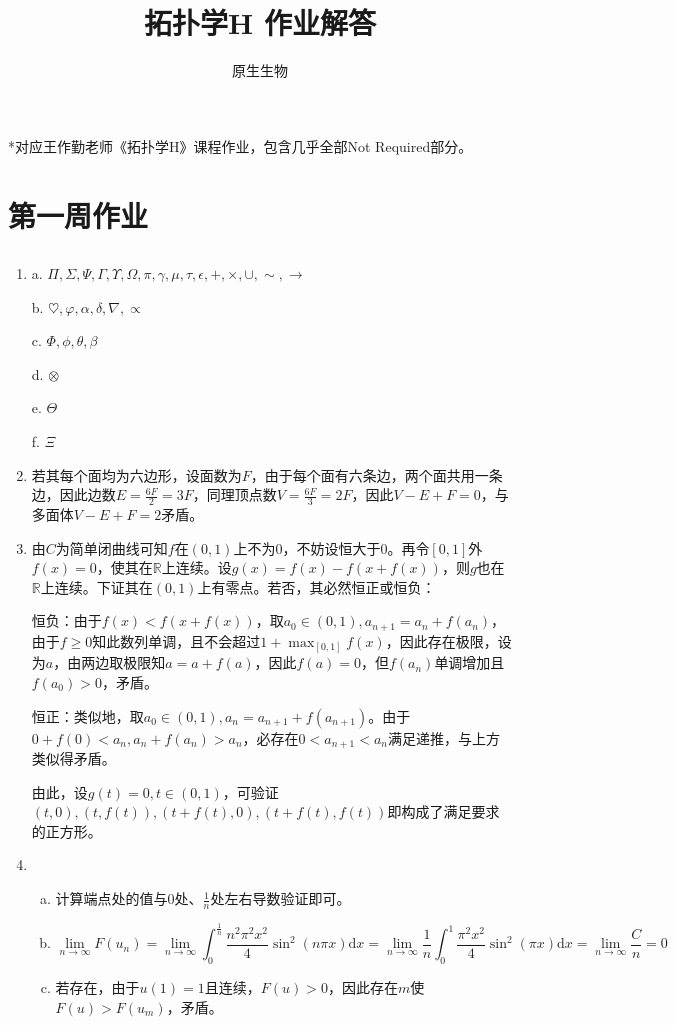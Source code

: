 \documentclass[a4paper,UTF8,fontset=windows]{ctexart}
\title{拓扑学H 作业解答}
\author{原生生物}
\date{}
\begin{document}
\maketitle
*对应王作勤老师《拓扑学H》课程作业，包含几乎全部Not Required部分。

\tableofcontents
\newpage
\section{第一周作业}
\subsection{}
\begin{enumerate}[(1)]
    \item
    a. $\Pi,\Sigma,\Psi,\Gamma,\Upsilon,\Omega,\pi,\gamma,\mu,\tau,\epsilon,+,\times,\cup,\sim,\to$
    
    b. $\heartsuit,\varphi,\alpha,\delta,\nabla,\propto$
    
    c. $\Phi,\phi,\theta,\beta$
    
    d. $\otimes$
    
    e. $\Theta$
    
    f. $\Xi$
    
    \item
    若其每个面均为六边形，设面数为$F$，由于每个面有六条边，两个面共用一条边，因此边数$E=\frac{6F}{2}=3F$，同理顶点数$V=\frac{6F}{3}=2F$，因此$V-E+F=0$，与多面体$V-E+F=2$矛盾。
    
    \item
    由$C$为简单闭曲线可知$f$在$(0,1)$上不为0，不妨设恒大于0。再令$[0,1]$外$f(x)=0$，使其在$\mathbb{R}$上连续。设$g(x)=f(x)-f(x+f(x))$，则$g$也在$\mathbb{R}$上连续。下证其在$(0,1)$上有零点。若否，其必然恒正或恒负：
    
    恒负：由于$f(x)<f(x+f(x))$，取$a_0\in(0,1),a_{n+1}=a_n+f(a_n)$，由于$f\ge0$知此数列单调，且不会超过$1+\max_{[0,1]}f(x)$，因此存在极限，设为$a$，由两边取极限知$a=a+f(a)$，因此$f(a)=0$，但$f(a_n)$单调增加且$f(a_0)>0$，矛盾。
    
    恒正：类似地，取$a_0\in(0,1),a_n=a_{n+1}+f(a_{n+1})$。由于$0+f(0)<a_n,a_n+f(a_n)>a_n$，必存在$0<a_{n+1}<a_n$满足递推，与上方类似得矛盾。
    
    由此，设$g(t)=0,t\in(0,1)$，可验证$(t,0),(t,f(t)),(t+f(t),0),(t+f(t),f(t))$即构成了满足要求的正方形。
    
    \item
    \begin{enumerate}[(a)]
    \item 计算端点处的值与0处、$\frac{1}{n}$处左右导数验证即可。
    \item \[\lim_{n\to\infty}F(u_n)=\lim_{n\to\infty}\int_0^\frac{1}{n}\frac{n^2\pi^2x^2}{4}\sin^2(n\pi x)\mathrm{d}x=\lim_{n\to\infty}\frac{1}{n}\int_0^1\frac{\pi^2x^2}{4}\sin^2(\pi x)\mathrm{d}x=\lim_{n\to\infty}\frac{C}{n}=0\]
    \item 若存在，由于$u(1)=1$且连续，$F(u)>0$，因此存在$m$使$F(u)>F(u_m)$，矛盾。
    \end{enumerate}
\end{enumerate}
\end{document}
